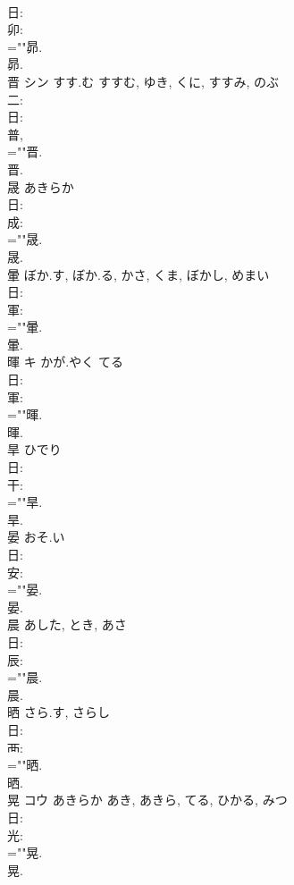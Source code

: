 \documentclass[8pt]{extreport}
\begin{document}
\begin{CJK}{UTF8}{min}
\\	日: 
\\	卯: 
\\	=""昴.
\\	昴.
\\	晋	シン	すす.む	すすむ, ゆき, くに, すすみ, のぶ	
\\	二: 
\\	日: 
\\	普, 
\\	=""晋.
\\	晋.
\\	晟		あきらか				
\\	日: 
\\	成: 
\\	=""晟.
\\	晟.
\\	暈		ぼか.す, ぼか.る, かさ, くま, ぼかし, めまい				
\\	日: 
\\	軍: 
\\	=""暈.
\\	暈.
\\	暉	キ	かが.やく	てる	
\\	日: 
\\	軍: 
\\	=""暉.
\\	暉.
\\	旱		ひでり				
\\	日: 
\\	干: 
\\	=""旱.
\\	旱.
\\	晏		おそ.い				
\\	日: 
\\	安: 
\\	=""晏.
\\	晏.
\\	晨		あした, とき, あさ				
\\	日: 
\\	辰: 
\\	=""晨.
\\	晨.
\\	晒		さら.す, さらし				
\\	日: 
\\	襾: 
\\	=""晒.
\\	晒.
\\	晃	コウ	あきらか	あき, あきら, てる, ひかる, みつ	
\\	日: 
\\	光: 
\\	=""晃.
\\	晃.

\end{CJK}
\end{document}
